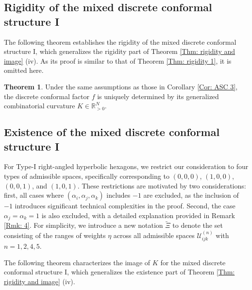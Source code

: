 \documentclass[12pt]{amsart}
\theoremstyle{definition}
\newtheorem{theorem}{Theorem}[section]
\begin{document}
\subsection{Rigidity of the mixed discrete conformal structure I}
The following theorem establishes the rigidity of the mixed discrete conformal structure I,
which generalizes the rigidity part of Theorem \ref{Thm: rigidity and image} (iv).
As its proof is similar to that of Theorem \ref{Thm: rigidity 1}, it is omitted here.

\begin{theorem}\label{Thm: rigidity 4}
Under the same assumptions as those in Corollary \ref{Cor: ASC 3},
the discrete conformal factor $f$ is uniquely determined by its generalized combinatorial curvature $K\in\mathbb{R}^N_{>0}$.
\end{theorem}

\subsection{Existence of the mixed discrete conformal structure I}\label{subsection: image 6}

For Type-I right-angled hyperbolic hexagons, we restrict our consideration to four types of admissible spaces, specifically corresponding to $(0,0,0)$, $(1,0,0)$, $(0,0,1)$, and $(1,0,1)$. 
These restrictions are motivated by two considerations: first, all cases where $(\alpha_i, \alpha_j, \alpha_k)$ includes $-1$ are excluded, as the inclusion of $-1$ introduces significant technical complexities in the proof. 
Second, the case $\alpha_j = \alpha_k = 1$ is also excluded, with a detailed explanation provided in Remark \ref{Rmk: 4}.
For simplicity, we introduce a new notation $\widetilde{\Xi}$ to denote the set consisting of the ranges of weights $\eta$ across all admissible spaces $\mathcal{U}^{(n)}_{ijk}$ with $n = 1, 2, 4, 5$.

The following theorem characterizes the image of $K$ for the mixed discrete conformal structure I,
which generalizes the existence part of Theorem \ref{Thm: rigidity and image} (iv).
\end{document}
